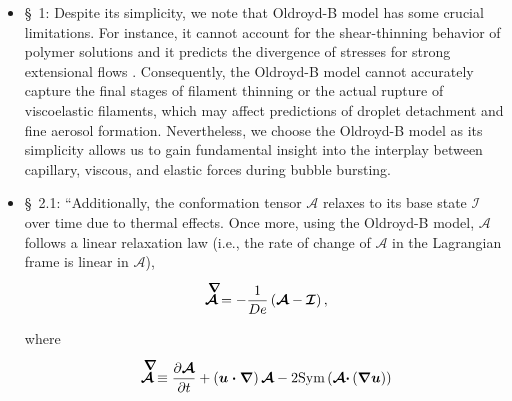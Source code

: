 \documentclass[]{article}
\newcommand{\oo}{\color{magenta} \normalfont}
\newcommand{\bb}{\color{black} \normalfont}
\begin{document}
\begin{enumerate}
\begin{enumerate}
     \begin{itemize}
        \item \S~1: \oo Despite its simplicity, we note that Oldroyd-B model has some crucial limitations.
        For instance, it cannot account for the shear-thinning behavior of polymer solutions and it predicts the divergence of stresses for strong extensional flows \citep{yamani2023master,alves2021numerical}.  
        Consequently, the Oldroyd-B model cannot accurately capture the final stages of filament thinning or the actual rupture of viscoelastic filaments, which may affect predictions of droplet detachment and fine aerosol formation.
        Nevertheless, we choose the Oldroyd-B model as its simplicity allows us to gain fundamental insight into the interplay between capillary, viscous, and elastic forces during bubble bursting.
        \bb\,
        \item \S~2.1: ``Additionally, the conformation tensor $ \boldsymbol{\mathcal{A}}$ relaxes to its base state $\boldsymbol{\mathcal{I}}$ over time due to thermal effects.
        Once more, using the Oldroyd-B model, $ \boldsymbol{\mathcal{A}}$ follows a linear relaxation law \oo (i.e., the rate of change of $\boldsymbol{\mathcal{A}}$ in the Lagrangian frame is linear in $\boldsymbol{\mathcal{A}}$),
        \bb\,

        \begin{align}
            \label{Aupperconv}
            \stackrel{\smash{\raisebox{0ex}{$\mkern8mu\boldsymbol{\nabla}$}}}{\boldsymbol{\mathcal{A}}}  =  - \frac{1}{De} \left( \boldsymbol{\mathcal{A}} - \boldsymbol{\mathcal{I}}  \right),
        \end{align}

        \noindent where

        \begin{align}
            \label{Aupper_def}
            \stackrel{\smash{\raisebox{0ex}{$\mkern8mu\boldsymbol{\nabla}$}}}{\boldsymbol{\mathcal{A}}} \equiv \frac{\partial\boldsymbol{\mathcal{A}}}{\partial t} + \left(\boldsymbol{u\cdot\nabla}\right)\boldsymbol{\mathcal{A}} - 2\text{Sym}\left(\boldsymbol{\mathcal{A}\cdot}\left(\boldsymbol{\nabla u}\right)\right)
        \end{align}


\end{itemize}
\end{enumerate}
\end{enumerate}
\end{document}
